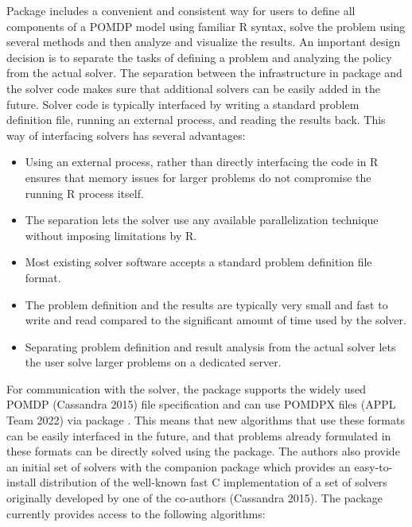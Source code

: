 Package  includes a convenient and consistent way for users to define all components of a POMDP
model using familiar R syntax, solve the problem using several methods and then analyze and visualize the results.
An important design decision is to separate the tasks of defining a problem and analyzing the policy from
the actual solver.
The separation between the infrastructure in
package  and the
solver code makes sure that additional solvers can be easily added in the future.
Solver code is typically interfaced by writing a standard problem definition file, running an external process,
and reading the results back. This way of interfacing solvers has several advantages:

\begin{itemize}
\tightlist
\item
  Using an external process, rather than directly interfacing the code in R ensures that memory issues for larger problems do not compromise the running R process itself.
\item
  The separation lets the solver use any available parallelization technique without imposing limitations
  by R.
\item
  Most existing solver software accepts a standard problem definition file format.
\item
  The problem definition and the results are typically very small and fast to write and read compared to the significant amount of time used by the solver.
\item
  Separating problem definition and result analysis from the actual solver lets the user solve larger problems
  on a dedicated server.
\end{itemize}

For communication with the solver, the package supports the widely used POMDP (Cassandra 2015) file specification and can use POMDPX files (APPL Team 2022) via package . This means that
new algorithms that use these formats can be easily interfaced in the future, and that
problems already formulated in these formats can be directly solved using the package.
The authors also provide an initial set of solvers with the companion package  which
provides an easy-to-install distribution of the well-known fast C implementation of a set of solvers originally developed by one of the co-authors (Cassandra 2015).
The package  currently provides access to the following algorithms:

